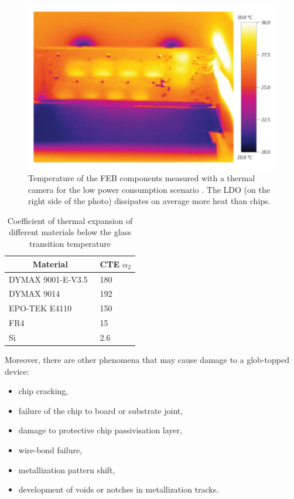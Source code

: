 \begin{figure}[!h]
\centering
\includegraphics[width=0.6\columnwidth]{Chapter3/Cycling/Images/feb_thermal.jpg}
\caption{Temperature of the \gls{FEB} components measured with a thermal camera for the low power consumption scenario \cite{leo_electronics}. The \gls{LDO} (on the right side of the photo) dissipates on average more heat than chips.}
\label{fig_temperatures_camera}
\end{figure}


\begin{table}[!h]
\begin{center}
\begin{tabular}{ll}
\hline
\multicolumn{1}{c}{Material} & \multicolumn{1}{c}{CTE $\alpha_{2}$} [\si{\micro\metre\per\metre\per\celsius]}] \\ \hline
DYMAX 9001-E-V3.5~\cite{9001}            & 180                                  \\
DYMAX 9014~\cite{9014}                   & 192                                  \\
EPO-TEK E4110~\cite{4110}                & 150                                  \\ \hline
FR4~\cite{FR4}                          & 15                                   \\
Si~\cite{Si}                           & 2.6                                 
\end{tabular}
\label{TCE}
\caption{Coefficient of thermal expansion of different materials below the glass transition temperature}
\end{center}
\end{table}

\newpage


Moreover, there are other phenomena that may cause damage to a glob-topped device:
\begin{itemize}
    \item chip cracking,
    \item failure of the chip to board or substrate joint,
    \item damage to protective chip passivisation layer,
    \item wire-bond failure,
    \item metallization pattern shift,
    \item development of voids or notches in metallization tracks. 
\end{itemize}


